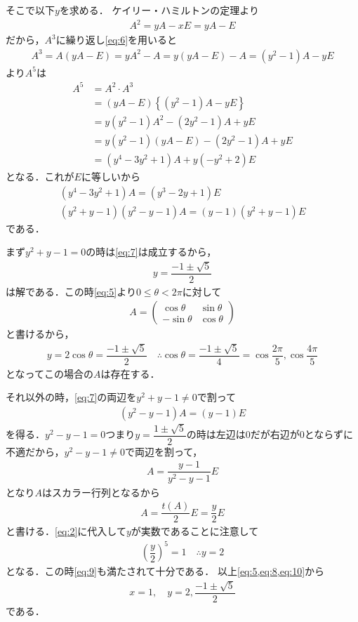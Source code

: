 \documentclass[../../main.tex]{subfiles}
\begin{document}
そこで以下$y$を求める．
ケイリー・ハミルトンの定理より
\begin{align}
  A^2=yA-xE = yA-E \label{eq:6}
\end{align}
だから，$A^3$に繰り返し\cref{eq:6}を用いると
\begin{align}
  A^3 = A(yA-E) = yA^2-A = y(yA-E)-A = (y^2-1)A-yE
\end{align}
より$A^5$は
\begin{align}
  A^5
  & = A^2\cdot A^3 \\
  & = (yA-E)\left\{(y^2-1)A-yE\right\} \\
  & = y(y^2-1)A^2 - (2y^2-1)A + yE \\
  & = y(y^2-1)(yA-E) - (2y^2-1)A + yE \\
  & = (y^4-3y^2+1)A + y(-y^2+2)E
\end{align}
となる．これが$E$に等しいから
\begin{align}
  (y^4-3y^2+1)A = (y^3-2y+1)E \\
  (y^2+y-1)(y^2-y-1)A = (y-1)(y^2+y-1)E \label{eq:7}
\end{align}
である．

まず$y^2+y-1=0$の時は\cref{eq:7}は成立するから，
\begin{align}
  y = \dfrac{-1\pm \sqrt{5}}{2} \label{eq:8}
\end{align}
は解である．この時\cref{eq:5}より$0\le\theta<2\pi$に対して
\begin{align}
  A =
  \begin{pmatrix}\cos\theta&\sin\theta\\ -\sin\theta&\cos\theta
  \end{pmatrix}
\end{align}
と書けるから，
\begin{align}
  y = 2\cos\theta = \dfrac{-1\pm \sqrt{5}}{2}
  \quad\therefore
  \cos\theta = \dfrac{-1\pm \sqrt{5}}{4} = \cos\dfrac{2\pi}{5}, \cos\dfrac{4\pi}{5}
\end{align}
となってこの場合の$A$は存在する．

それ以外の時，\cref{eq:7}の両辺を$y^2+y-1 \neq 0$で割って
\begin{align}
  (y^2-y-1)A = (y-1)E
\end{align}
を得る．$y^2-y-1=0$つまり$y=\dfrac{1\pm\sqrt{5}}{2}$の時は左辺は$0$だが右辺が$0$とならずに不適だから，$y^2-y-1\neq 0$で両辺を割って，
\begin{align}
  A = \dfrac{y-1}{y^2-y-1}E \label{eq:9}
\end{align}
となり$A$はスカラー行列となるから
\begin{align}
  A = \dfrac{t(A)}{2}E = \dfrac{y}{2}E
\end{align}
と書ける．\cref{eq:2}に代入して$y$が実数であることに注意して
\begin{align}
  \left(\dfrac{y}{2}\right)^5 = 1 \quad \therefore y = 2 \label{eq:10}
\end{align}
となる．この時\cref{eq:9}も満たされて十分である．
以上\cref{eq:5,eq:8,eq:10}から
\begin{align}
  x = 1, \quad
  y = 2, \dfrac{-1\pm\sqrt{5}}{2}
\end{align}
である．

\newpage
\end{document}
